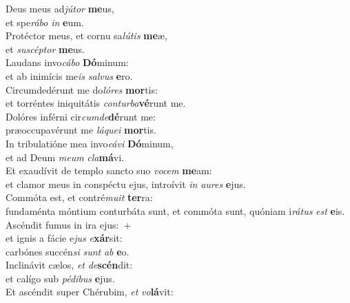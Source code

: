 \evenverse Deus meus ad\textit{jú}\textit{tor} \textbf{me}us,~\*\\
\evenverse et spe\textit{rá}\textit{bo} \textit{in} \textbf{e}um.\\
\oddverse Protéctor meus, et cornu sa\textit{lú}\textit{tis} \textbf{me}æ,~\*\\
\oddverse et \textit{su}\textit{scép}\textit{tor} \textbf{me}us.\\
\evenverse Laudans invo\textit{cá}\textit{bo} \textbf{Dó}minum:~\*\\
\evenverse et ab inimícis me\textit{is} \textit{sal}\textit{vus} \textbf{e}ro.\\
\oddverse Circumdedérunt me do\textit{ló}\textit{res} \textbf{mor}tis:~\*\\
\oddverse et torréntes iniquitátis \textit{con}\textit{tur}\textit{ba}\textbf{vé}runt me.\\
\evenverse Dolóres inférni cir\textit{cum}\textit{de}\textbf{dé}runt me:~\*\\
\evenverse præoccupavérunt me \textit{lá}\textit{que}\textit{i} \textbf{mor}tis.\\
\oddverse In tribulatióne mea invo\textit{cá}\textit{vi} \textbf{Dó}minum,~\*\\
\oddverse et ad Deum \textit{me}\textit{um} \textit{cla}\textbf{má}vi.\\
\evenverse Et exaudívit de templo sancto suo \textit{vo}\textit{cem} \textbf{me}am:~\*\\
\evenverse et clamor meus in conspéctu ejus, introívit \textit{in} \textit{au}\textit{res} \textbf{e}jus.\\
\oddverse Commóta est, et contré\textit{mu}\textit{it} \textbf{ter}ra:~\*\\
\oddverse fundaménta móntium conturbáta sunt, et commóta sunt, quóniam i\textit{rá}\textit{tus} \textit{est} \textbf{e}is.\\
\evenverse Ascéndit fumus in ira ejus:~+\\
\evenverse  et ignis a fácie e\textit{jus} \textit{e}\textbf{xár}sit:~\*\\
\evenverse carbónes succén\textit{si} \textit{sunt} \textit{ab} \textbf{e}o.\\
\oddverse Inclinávit cælos, \textit{et} \textit{de}\textbf{scén}dit:~\*\\
\oddverse et calígo sub \textit{pé}\textit{di}\textit{bus} \textbf{e}jus.\\
\evenverse Et ascéndit super Chérubim, \textit{et} \textit{vo}\textbf{lá}vit:~\*\\
